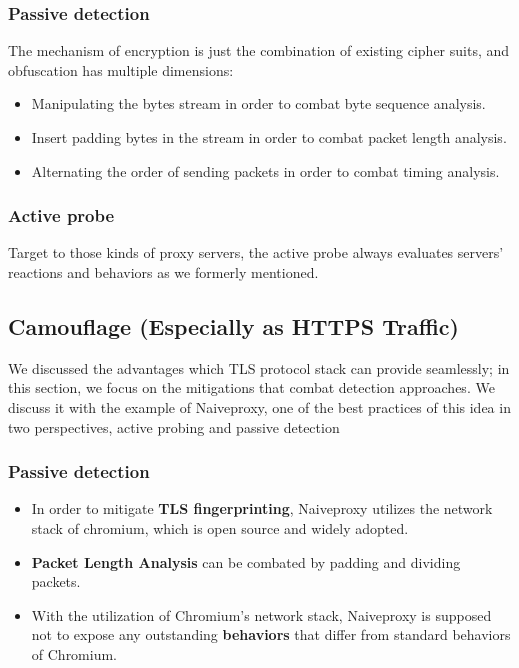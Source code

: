 \documentclass[conference]{IEEEtran}
\begin{document}
\subsubsection{Passive detection}
The mechanism of encryption is just the combination of existing cipher suits, and obfuscation has multiple dimensions:
\begin{itemize}
    \item Manipulating the bytes stream in order to combat byte sequence analysis.
    \item Insert padding bytes in the stream in order to combat packet length analysis.
    \item Alternating the order of sending packets in order to combat timing analysis.
\end{itemize}

\subsubsection{Active probe}
Target to those kinds of proxy servers, the active probe always evaluates servers' reactions and behaviors as we formerly mentioned.

\subsection{Camouflage (Especially as HTTPS Traffic)}
We discussed the advantages which TLS protocol stack can provide seamlessly; in this section, we focus on the mitigations that combat detection approaches. We discuss it with the example of Naiveproxy, one of the best practices of this idea in two perspectives, active probing and passive detection

\subsubsection{Passive detection}
\begin{itemize}
    \item In order to mitigate \textbf{TLS fingerprinting}, Naiveproxy utilizes the network stack of chromium, which is open source and widely adopted.
    \item \textbf{Packet Length Analysis} can be combated by padding and dividing packets.
    \item  With the utilization of Chromium's network stack, Naiveproxy is supposed not to expose any outstanding \textbf{behaviors} that differ from standard behaviors of Chromium.
\end{itemize}
\end{document}
